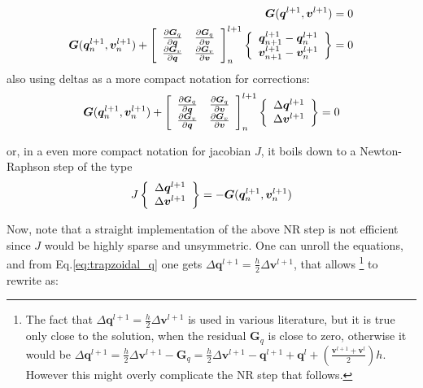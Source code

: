 \documentclass{digitaldynamics}
\def\vect#1{\bm{#1}}
\def\matr#1{{#1}}
\begin{document}
\begin{align}
\vect{G}(\vect{q}^{l+1},\vect{v}^{l+1}) = 0 \\
\vect{G}(\vect{q}^{l+1}_n,\vect{v}^{l+1}_n) + 
\left[ 
\begin{array}[pos]{cc}
	\frac{\partial \vect{G}_q}{\partial \vect{q}} & \frac{\partial \vect{G}_q}{\partial \vect{v}}  \\
	\frac{\partial \vect{G}_v}{\partial \vect{q}} & \frac{\partial \vect{G}_v}{\partial \vect{v}} 
\end{array}
 \right]_n^{l+1} 
\left\{ 
\begin{array}[pos]{c}
	\vect{q}^{l+1}_{n+1} - \vect{q}^{l+1}_{n} \\ 
	\vect{v}^{l+1}_{n+1} - \vect{v}^{l+1}_{n}
\end{array}
 \right\}
 = 0  
\end{align}
%
also using deltas as a more compact notation for corrections:
\begin{align}
\vect{G}(\vect{q}^{l+1}_n,\vect{v}^{l+1}_n) + \left[ 
\begin{array}[pos]{cc}
	\frac{\partial \vect{G}_q}{\partial \vect{q}} & \frac{\partial \vect{G}_q}{\partial \vect{v}}  \\
	\frac{\partial \vect{G}_v}{\partial \vect{q}} & \frac{\partial \vect{G}_v}{\partial \vect{v}} 
\end{array}
 \right]_n^{l+1}
\left\{  
\begin{array}[pos]{c}
	\Delta\vect{q}^{l+1} \\ 
	\Delta\vect{v}^{l+1}
\end{array}
 \right\} 
 = 0  
\label{eq:trapzoidal_qv}
\end{align}
%

or, in a even more compact notation for jacobian $\matr{J}$, it boils down to a Newton-Raphson step of the type 
\begin{align}
\matr{J}
\left\{ 
\begin{array}[pos]{c}
	\Delta\vect{q}^{l+1} \\ 
	\Delta\vect{v}^{l+1}
\end{array}
 \right\} 
 = -\vect{G}(\vect{q}^{l+1}_n,\vect{v}^{l+1}_n)
\end{align}

Now, note that a straight implementation of the above NR step is not efficient since $J$ would be highly sparse and unsymmetric. 
One can unroll the equations, and from Eq.\ref{eq:trapzoidal_q} one gets
$\Delta\vect{q}^{l+1}=\frac{h}{2}\Delta\vect{v}^{l+1}$, that allows 
	\footnote{The fact that $\Delta\vect{q}^{l+1}=\frac{h}{2}\Delta\vect{v}^{l+1}$ is used in various literature, 
	but it is true only close to the solution, when 
	the residual $\vect{G}_q$ is close to zero, 
	otherwise it would be 
	$\Delta\vect{q}^{l+1}=\frac{h}{2}\Delta\vect{v}^{l+1}-\vect{G}_q = \frac{h}{2}\Delta\vect{v}^{l+1} -\vect{q}^{l+1}+\vect{q}^l + \left( \frac{\vect{v}^{l+1}+\vect{v}^l}{2} \right) h$. However this might overly complicate the NR step that follows. } 
to rewrite as: 
\end{document}
